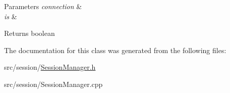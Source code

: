 \begin{DoxyParams}{Parameters}
{\em connection} & \\
\hline
{\em is} & \\
\hline
\end{DoxyParams}
\begin{DoxyReturn}{Returns}
boolean 
\end{DoxyReturn}


The documentation for this class was generated from the following files\-:\begin{DoxyCompactItemize}
\item 
src/session/\hyperlink{_session_manager_8h}{Session\-Manager.\-h}\item 
src/session/Session\-Manager.\-cpp\end{DoxyCompactItemize}
